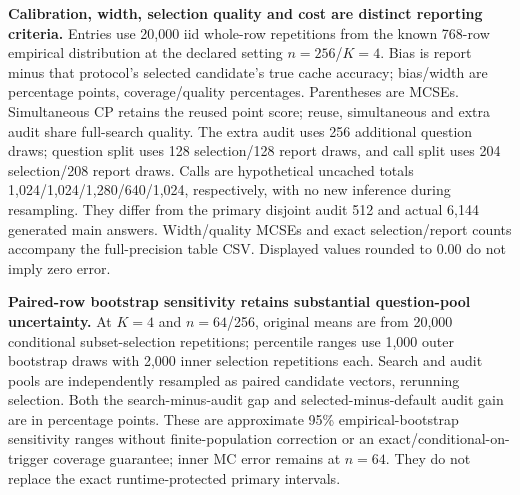 \begin{table}[htbp]
\caption{\textbf{Calibration, width, selection quality and cost are distinct reporting criteria.} Entries use 20,000 iid whole-row repetitions from the known 768-row empirical distribution at the declared setting $n=256$/$K=4$. Bias is report minus that protocol's selected candidate's true cache accuracy; bias/width are percentage points, coverage/quality percentages. Parentheses are MCSEs. Simultaneous CP retains the reused point score; reuse, simultaneous and extra audit share full-search quality. The extra audit uses 256 additional question draws; question split uses 128 selection/128 report draws, and call split uses 204 selection/208 report draws. Calls are hypothetical uncached totals 1,024/1,024/1,280/640/1,024, respectively, with no new inference during resampling. They differ from the primary disjoint audit 512 and actual 6,144 generated main answers. Width/quality MCSEs and exact selection/report counts accompany the full-precision table CSV. Displayed values rounded to 0.00 do not imply zero error.}
\label{tab:real-cache-methods}
\centering
{\fontsize{8}{9}\selectfont}
\end{table}

\begin{table}[htbp]
\caption{\textbf{Paired-row bootstrap sensitivity retains substantial question-pool uncertainty.} At $K=4$ and $n=64$/256, original means are from 20,000 conditional subset-selection repetitions; percentile ranges use 1,000 outer bootstrap draws with 2,000 inner selection repetitions each. Search and audit pools are independently resampled as paired candidate vectors, rerunning selection. Both the search-minus-audit gap and selected-minus-default audit gain are in percentage points. These are approximate 95\% empirical-bootstrap sensitivity ranges without finite-population correction or an exact/conditional-on-trigger coverage guarantee; inner MC error remains at $n=64$. They do not replace the exact runtime-protected primary intervals.}
\label{tab:real-bootstrap}
\centering
{\fontsize{8}{9}\selectfont}
\end{table}

\clearpage

